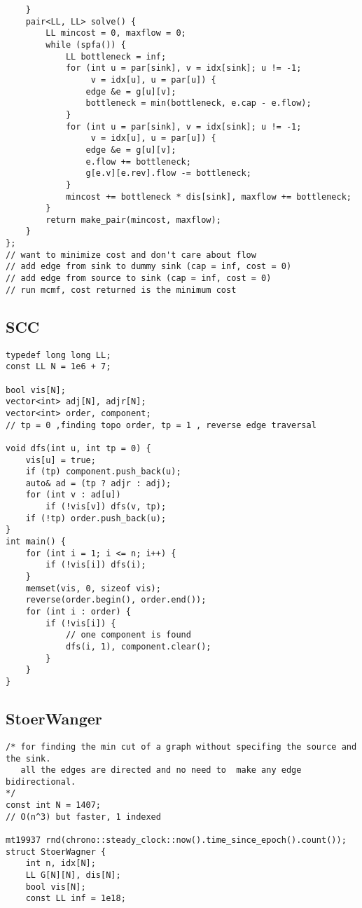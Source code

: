 \documentclass[FSZ,a4paper,onesided]{article}
\begin{document}
\begin{multicols*}{\COLS}
\begin{lstlisting}
    }
    pair<LL, LL> solve() {
        LL mincost = 0, maxflow = 0;
        while (spfa()) {
            LL bottleneck = inf;
            for (int u = par[sink], v = idx[sink]; u != -1;
                 v = idx[u], u = par[u]) {
                edge &e = g[u][v];
                bottleneck = min(bottleneck, e.cap - e.flow);
            }
            for (int u = par[sink], v = idx[sink]; u != -1;
                 v = idx[u], u = par[u]) {
                edge &e = g[u][v];
                e.flow += bottleneck;
                g[e.v][e.rev].flow -= bottleneck;
            }
            mincost += bottleneck * dis[sink], maxflow += bottleneck;
        }
        return make_pair(mincost, maxflow);
    }
};
// want to minimize cost and don't care about flow
// add edge from sink to dummy sink (cap = inf, cost = 0)
// add edge from source to sink (cap = inf, cost = 0)
// run mcmf, cost returned is the minimum cost
\end{lstlisting}
\subsection{SCC}
\begin{lstlisting}
typedef long long LL;
const LL N = 1e6 + 7;

bool vis[N];
vector<int> adj[N], adjr[N];
vector<int> order, component;
// tp = 0 ,finding topo order, tp = 1 , reverse edge traversal

void dfs(int u, int tp = 0) {
    vis[u] = true;
    if (tp) component.push_back(u);
    auto& ad = (tp ? adjr : adj);
    for (int v : ad[u])
        if (!vis[v]) dfs(v, tp);
    if (!tp) order.push_back(u);
}
int main() {
    for (int i = 1; i <= n; i++) {
        if (!vis[i]) dfs(i);
    }
    memset(vis, 0, sizeof vis);
    reverse(order.begin(), order.end());
    for (int i : order) {
        if (!vis[i]) {
            // one component is found
            dfs(i, 1), component.clear();
        }
    }
}

\end{lstlisting}
\subsection{StoerWanger}
\begin{lstlisting}
/* for finding the min cut of a graph without specifing the source and  the sink.
   all the edges are directed and no need to  make any edge bidirectional.
*/
const int N = 1407;
// O(n^3) but faster, 1 indexed

mt19937 rnd(chrono::steady_clock::now().time_since_epoch().count());
struct StoerWagner {
    int n, idx[N];
    LL G[N][N], dis[N];
    bool vis[N];
    const LL inf = 1e18;


\end{lstlisting}
\end{multicols*}
\end{document}
